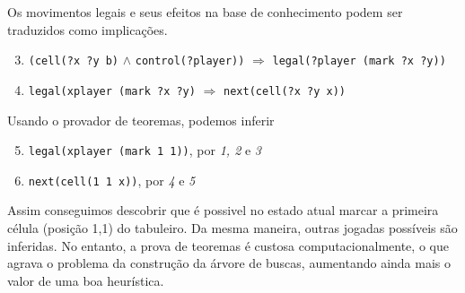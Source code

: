 Os movimentos legais e seus efeitos na base de conhecimento podem ser traduzidos
como implicações. 
\begin{enumerate}
  \setcounter{enumi}{2}
  \item \verb|(cell(?x ?y b)| $\land$ \verb|control(?player))|  
    $\Rightarrow$ \verb|legal(?player (mark ?x ?y))|
  \item \verb|legal(xplayer (mark ?x ?y)| $\Rightarrow$ 
    \verb|next(cell(?x ?y x))|
\end{enumerate}

Usando o provador de teoremas, podemos inferir 
\begin{enumerate}
  \setcounter{enumi}{4}
  \item \verb|legal(xplayer (mark 1 1))|, por {\it 1, 2} e {\it 3}
  \item \verb|next(cell(1 1 x))|, por {\it 4} e {\it 5}
\end{enumerate}

Assim conseguimos descobrir que é possivel no estado atual marcar a primeira
célula (posição 1,1) do tabuleiro. Da mesma maneira, outras jogadas possíveis
são inferidas. No entanto, a prova de teoremas é custosa computacionalmente, o
que agrava o problema da construção da árvore de buscas, aumentando ainda mais o
valor de uma boa heurística.